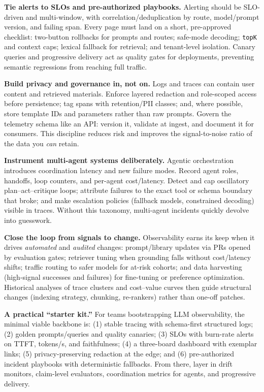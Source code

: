 \medskip
\noindent\textbf{Tie alerts to SLOs and pre-authorized playbooks.}
Alerting should be SLO-driven and multi-window, with correlation/deduplication by route, model/prompt version, and failing span. Every page must land on a short, pre-approved checklist: two-button rollbacks for prompts and routes; safe-mode decoding; \texttt{topK} and context caps; lexical fallback for retrieval; and tenant-level isolation. Canary queries and progressive delivery act as quality gates for deployments, preventing semantic regressions from reaching full traffic.

\medskip
\noindent\textbf{Build privacy and governance in, not on.}
Logs and traces can contain user content and retrieved materials. Enforce layered redaction and role-scoped access before persistence; tag spans with retention/PII classes; and, where possible, store template IDs and parameters rather than raw prompts. Govern the telemetry schema like an API: version it, validate at ingest, and document it for consumers. This discipline reduces risk and improves the signal-to-noise ratio of the data you \emph{can} retain.

\medskip
\noindent\textbf{Instrument multi-agent systems deliberately.}
Agentic orchestration introduces coordination latency and new failure modes. Record agent roles, handoffs, loop counters, and per-agent cost/latency. Detect and cap oscillatory plan–act–critique loops; attribute failures to the exact tool or schema boundary that broke; and make escalation policies (fallback models, constrained decoding) visible in traces. Without this taxonomy, multi-agent incidents quickly devolve into guesswork.

\medskip
\noindent\textbf{Close the loop from signals to change.}
Observability earns its keep when it drives \emph{automated} and \emph{audited} changes: prompt/library updates via PRs opened by evaluation gates; retriever tuning when grounding falls without cost/latency shifts; traffic routing to safer models for at-risk cohorts; and data harvesting (high-signal successes and failures) for fine-tuning or preference optimization. Historical analyses of trace clusters and cost–value curves then guide structural changes (indexing strategy, chunking, re-rankers) rather than one-off patches.

\medskip
\noindent\textbf{A practical ``starter kit.''}
For teams bootstrapping LLM observability, the minimal viable backbone is: (1) stable tracing with schema-first structured logs; (2) golden prompts/queries and quality canaries; (3) SLOs with burn-rate alerts on TTFT, tokens/s, and faithfulness; (4) a three-board dashboard with exemplar links; (5) privacy-preserving redaction at the edge; and (6) pre-authorized incident playbooks with deterministic fallbacks. From there, layer in drift monitors, claim-level evaluators, coordination metrics for agents, and progressive delivery.

